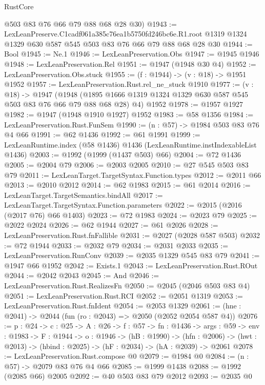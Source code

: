 \begin{lexlean}{RustCore}
\begin{coremodule}
      @503
      @83
      @76
      @66
      @79
      @88
      @68
      @28
      @30)
@1943 := LexLeanPreserve.C1cadf061a385c76ea1b5750fd246bc6e.R1.root
    @1319
    @1324
    @1329
    @630
    @587
    @545
    @503
    @83
    @76
    @66
    @79
    @88
    @68
    @28
    @30
@1944 := Bool
@1945 := Ne.{1}
@1946 := LexLeanPreservation.Obs
@1947 := @1945 @1946
@1948 := LexLeanPreservation.Rel
@1951 := @1947 (@1948 @30 @4)
@1952 := LexLeanPreservation.Obs.stuck
@1955 := (f : @1944) -> (v : @18) -> @1951 @1952
@1957 := LexLeanPreservation.Rust.rel_ne_stuck @1910
@1977 := (v : @18) ->
  @1947
    (@1948 (@1895 @1666 @1319 @1324 @1329 @630 @587 @545 @503 @83 @76 @66 @79 @88 @68 @28) @4)
    @1952
@1978 := @1957 @1927
@1982 := @1947 (@1948 @1910 @1927) @1952
@1983 := @58 @1356
@1984 := LexLeanPreservation.Rust.FunSem
@1990 := (n : @57) -> @1984 @503 @83 @76 @4 @66
@1991 := @62 @1436
@1992 := @61 @1991
@1999 := LexLeanRuntime.index (@58 @1436) @1436 (LexLeanRuntime.instIndexableList @1436)
@2003 := @1992 (@1999 (@1437 @503) @66)
@2004 := @72 @1436
@2005 := @2004 @79
@2006 := @2003 @2005
@2010 := @27 @545 @503 @83 @79
@2011 := LexLeanTarget.TargetSyntax.Function.types
@2012 := @2011 @66
@2013 := @2010 @2012
@2014 := @62 @1983
@2015 := @61 @2014
@2016 := LexLeanTarget.TargetSemantics.bindAll
@2017 := LexLeanTarget.TargetSyntax.Function.parameters
@2022 := @2015 (@2016 (@2017 @76) @66 @1403)
@2023 := @72 @1983
@2024 := @2023 @79
@2025 := @2022 @2024
@2026 := @62 @1944
@2027 := @61 @2026
@2028 := LexLeanPreservation.Rust.fnFallible
@2031 := @2027 (@2028 @587 @503)
@2032 := @72 @1944
@2033 := @2032 @79
@2034 := @2031 @2033
@2035 := LexLeanPreservation.RunConv
@2039 := @2035 @1329 @545 @83 @79
@2041 := @1947 @66 @1952
@2042 := Exists.{1}
@2043 := LexLeanPreservation.Rust.ROut
@2044 := @2042 @2043
@2045 := And
@2046 := LexLeanPreservation.Rust.RealizesFn
@2050 := @2045 (@2046 @503 @83 @4)
@2051 := LexLeanPreservation.Rust.RCI
@2052 := @2051 @1319
@2053 := LexLeanPreservation.Rust.fnIdent
@2054 := @2053 @1329
@2061 := (hne : @2041) -> @2044 (fun (ro : @2043) => @2050 (@2052 @2054 @587 @4))
@2076 := {p : @24} ->
  {c : @25} ->
  {A : @26} ->
  {f : @57} ->
  {fn : @1436} ->
  {args : @59} ->
  {env : @1983} ->
  {F : @1944} ->
  {o : @1946} ->
  (hB : @1990) ->
  (hfn : @2006) -> (hwt : @2013) -> (hbind : @2025) -> (hF : @2034) -> (hA : @2039) -> @2061
@2078 := LexLeanPreservation.Rust.compose @0
@2079 := @1984 @0
@2084 := (n : @57) -> @2079 @83 @76 @4 @66
@2085 := @1999 @1438
@2088 := @1992 (@2085 @66) @2005
@2092 := @40 @503 @83 @79 @2012
@2093 := @2035 @0

\end{coremodule}
\end{lexlean}
